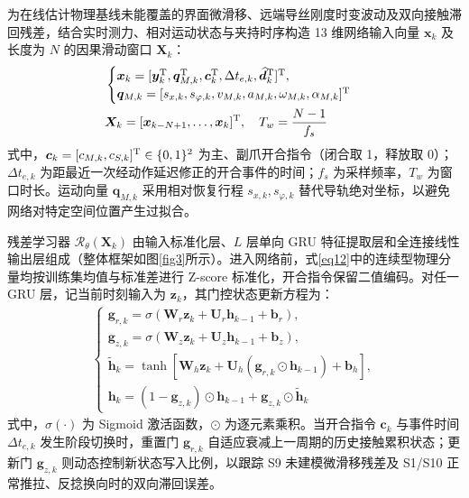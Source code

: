 \documentclass{JQRnew}
\begin{document}
为在线估计物理基线未能覆盖的界面微滑移、远端导丝刚度时变波动及双向接触滞回残差，结合实时测力、相对运动状态与夹持时序构造 13 维网络输入向量 $\bm{x}_{k}$ 及长度为 $N$ 的因果滑动窗口 $\bm{X}_{k}$：
\begin{align}
	\label{eq12}
	&\begin{cases}
		\bm{x}_{k} = [\bm{y}_{k}^{\rm T},\bm{q}_{M,k}^{\rm T},\bm{c}_{k}^{\rm T},\Delta t_{e,k},\widehat{\bm{d}}_{k}^{\rm T}]^{\rm T}, \\
		\bm{q}_{M,k} = [s_{x,k},s_{\varphi,k},v_{M,k},a_{M,k},\omega_{M,k},\alpha_{M,k}]^{\rm T}
	\end{cases} \\
	\label{eq13}
	&\bm{X}_{k} = [\bm{x}_{k - N + 1},\ldots,\bm{x}_{k}]^{\rm T},\quad T_{w} = \frac{N - 1}{f_{s}}
\end{align}
式中，$\bm{c}_{k} = [c_{M,k},c_{S,k}]^{\rm T} \in \{0,1\}^{2}$ 为主、副爪开合指令（闭合取 1，释放取 0）；$\Delta t_{e,k}$ 为距最近一次经动作延迟修正的开合事件的时间；$f_{s}$ 为采样频率，$T_{w}$ 为窗口时长。运动向量 $\bm{q}_{M,k}$ 采用相对恢复行程 $s_{x,k}, s_{\varphi,k}$ 替代导轨绝对坐标，以避免网络对特定空间位置产生过拟合。

残差学习器 $\mathcal{R}_{\theta}(\bm{X}_{k})$ 由输入标准化层、$L$ 层单向 GRU 特征提取层和全连接线性输出层组成（整体框架如图\ref{fig3}所示）。进入网络前，式\eqref{eq12}中的连续型物理分量均按训练集均值与标准差进行 Z-score 标准化，开合指令保留二值编码。对任一 GRU 层，记当前时刻输入为 $\bm{z}_{k}$，其门控状态更新方程为：
\begin{align}
	\label{eq14}
	\begin{cases}
		\bm{g}_{r,k} = \sigma(\bm{W}_{r}\bm{z}_{k} + \bm{U}_{r}\bm{h}_{k - 1} + \bm{b}_{r}), \\
		\bm{g}_{z,k} = \sigma(\bm{W}_{z}\bm{z}_{k} + \bm{U}_{z}\bm{h}_{k - 1} + \bm{b}_{z}), \\
		\widetilde{\bm{h}}_{k} = \tanh[\bm{W}_{h}\bm{z}_{k} + \bm{U}_{h}(\bm{g}_{r,k} \odot \bm{h}_{k - 1}) + \bm{b}_{h}], \\
		\bm{h}_{k} = (1 - \bm{g}_{z,k}) \odot \bm{h}_{k - 1} + \bm{g}_{z,k} \odot \widetilde{\bm{h}}_{k}
	\end{cases}
\end{align}
式中，$\sigma(\cdot)$ 为 Sigmoid 激活函数，$\odot$ 为逐元素乘积。当开合指令 $\bm{c}_{k}$ 与事件时间 $\Delta t_{e,k}$ 发生阶段切换时，重置门 $\bm{g}_{r,k}$ 自适应衰减上一周期的历史接触累积状态；更新门 $\bm{g}_{z,k}$ 则动态控制新状态写入比例，以跟踪 S9 未建模微滑移残差及 S1/S10 正常推拉、反捻换向时的双向滞回误差。
\end{document}
